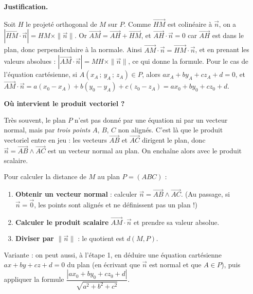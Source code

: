\documentclass[11pt]{article}
\newcommand{\cle}[1]{{\popxbold\color{popdark}#1}}
\begin{document}
\textbf{Justification.}\par
Soit $H$ le projeté orthogonal de $M$ sur $P$. Comme $\overrightarrow{HM}$ est colinéaire à $\vec{n}$, on a $\left|\overrightarrow{HM} \cdot \vec{n}\right| = HM \times \|\vec{n}\|$. Or $\overrightarrow{AM} = \overrightarrow{AH} + \overrightarrow{HM}$, et $\overrightarrow{AH} \cdot \vec{n} = 0$ car $\overrightarrow{AH}$ est dans le plan, donc perpendiculaire à la normale. Ainsi $\overrightarrow{AM} \cdot \vec{n} = \overrightarrow{HM} \cdot \vec{n}$, et en prenant les valeurs absolues : $\left|\overrightarrow{AM} \cdot \vec{n}\right| = MH \times \|\vec{n}\|$, ce qui donne la formule. Pour le cas de l'équation cartésienne, si $A(x_A\,;\,y_A\,;\,z_A) \in P$, alors $ax_A + by_A + cz_A + d = 0$, et $\overrightarrow{AM} \cdot \vec{n} = a(x_0 - x_A) + b(y_0 - y_A) + c(z_0 - z_A) = ax_0 + by_0 + cz_0 + d$.

\textbf{Où intervient le produit vectoriel ?}\par
Très souvent, le plan $P$ n'est pas donné par une équation ni par un vecteur normal, mais par \emph{trois points} $A$, $B$, $C$ non alignés. C'est là que le produit vectoriel entre en jeu : les vecteurs $\overrightarrow{AB}$ et $\overrightarrow{AC}$ dirigent le plan, donc $\vec{n} = \overrightarrow{AB} \wedge \overrightarrow{AC}$ est un vecteur \cle{normal} au plan. On enchaîne alors avec le produit scalaire.

\begin{methode}
Pour calculer la distance de $M$ au plan $P = (ABC)$ :
\begin{enumerate}
\item \textbf{Obtenir un vecteur normal} : calculer $\vec{n} = \overrightarrow{AB} \wedge \overrightarrow{AC}$. (Au passage, si $\vec{n} = \vec{0}$, les points sont alignés et ne définissent pas un plan !)
\item \textbf{Calculer le produit scalaire} $\overrightarrow{AM} \cdot \vec{n}$ et prendre sa valeur absolue.
\item \textbf{Diviser par $\|\vec{n}\|$} : le quotient est $d(M, P)$.
\end{enumerate}
Variante : on peut aussi, à l'étape 1, en déduire une équation cartésienne $ax + by + cz + d = 0$ du plan (en écrivant que $\vec{n}$ est normal et que $A \in P$), puis appliquer la formule $\dfrac{|ax_0+by_0+cz_0+d|}{\sqrt{a^2+b^2+c^2}}$.
\end{methode}
\end{document}
